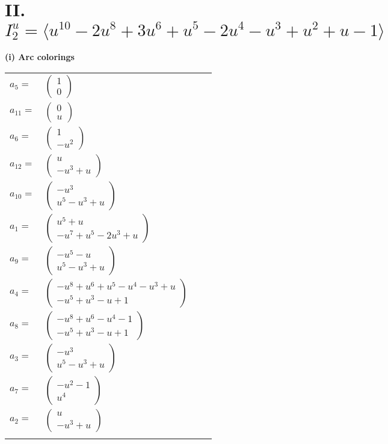 \documentclass[1p]{elsarticle_modified}
\theoremstyle{definition}
\begin{document}
\centering \section*{II. $I^u_{2}= \langle u^{10}-2 u^8+3 u^6+u^5-2 u^4- u^3+u^2+u-1 \rangle$}
\flushleft \textbf{(i) Arc colorings}\\
\begin{tabular}{m{7pt} m{180pt} m{7pt} m{180pt} }
\flushright $a_{5}=$&$\begin{pmatrix}1\\0\end{pmatrix}$ \\
\flushright $a_{11}=$&$\begin{pmatrix}0\\u\end{pmatrix}$ \\
\flushright $a_{6}=$&$\begin{pmatrix}1\\- u^2\end{pmatrix}$ \\
\flushright $a_{12}=$&$\begin{pmatrix}u\\- u^3+u\end{pmatrix}$ \\
\flushright $a_{10}=$&$\begin{pmatrix}- u^3\\u^5- u^3+u\end{pmatrix}$ \\
\flushright $a_{1}=$&$\begin{pmatrix}u^5+u\\- u^7+u^5-2 u^3+u\end{pmatrix}$ \\
\flushright $a_{9}=$&$\begin{pmatrix}- u^5- u\\u^5- u^3+u\end{pmatrix}$ \\
\flushright $a_{4}=$&$\begin{pmatrix}- u^8+u^6+u^5- u^4- u^3+u\\- u^5+u^3- u+1\end{pmatrix}$ \\
\flushright $a_{8}=$&$\begin{pmatrix}- u^8+u^6- u^4-1\\- u^5+u^3- u+1\end{pmatrix}$ \\
\flushright $a_{3}=$&$\begin{pmatrix}- u^3\\u^5- u^3+u\end{pmatrix}$ \\
\flushright $a_{7}=$&$\begin{pmatrix}- u^2-1\\u^4\end{pmatrix}$ \\
\flushright $a_{2}=$&$\begin{pmatrix}u\\- u^3+u\end{pmatrix}$\\&\end{tabular}
\end{document}
